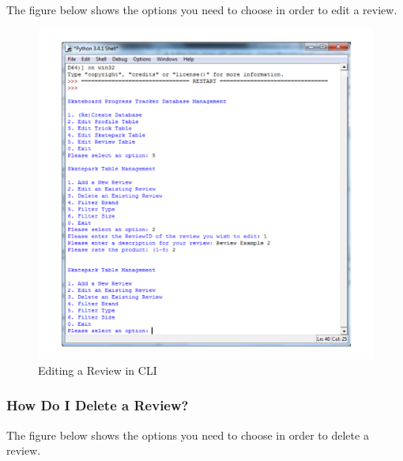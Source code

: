 The figure below shows the options you need to choose in order to edit a review.

\begin{figure}[H]
    \includegraphics[width=\textwidth]{./Manual/Images/EditReview.pdf}
    \caption{Editing a Review in CLI} \label{fig:Edit Review}
\end{figure}

 
\subsubsection{How Do I Delete a Review?} \label{DeleteReview}

The figure below shows the options you need to choose in order to delete a review.

